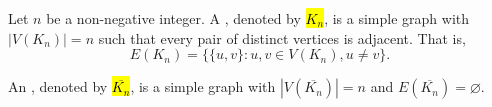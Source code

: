 \begin{definition} \label{definition:complete_graph_empty_graph}
Let $n$ be a non-negative integer. A , denoted by \hl{$K_n$}, is a simple graph with $|V(K_n)| = n$ such that every pair of distinct vertices is adjacent. That is,
$$E(K_n) = \{\{u,v\} : u,v \in V(K_n), u \neq v\}.$$

An , denoted by \hl{$\overline{K_n}$}, is a simple graph with $|V(\overline{K_n})| = n$ and $E(\overline{K_n}) = \varnothing$.
\end{definition}
